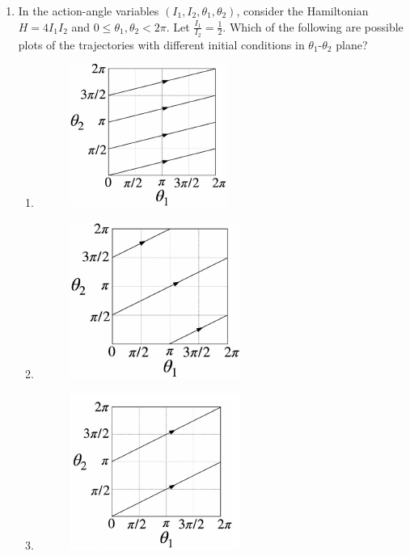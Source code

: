 \documentclass[journal,12pt,onecolumn]{IEEEtran}
\theoremstyle{remark}
\begin{document}
\begin{enumerate}
\item
In the action-angle variables $(I_1, I_2, \theta_1, \theta_2)$, consider the Hamiltonian $H = 4I_1 I_2$ and $0 \le \theta_1, \theta_2 < 2\pi$. Let $\frac{I_1}{I_2} = \frac{1}{2}$. Which of the following are possible plots of the trajectories with different initial conditions in $\theta_1$-$\theta_2$ plane?
\begin{enumerate}
    \item \begin{figure}[H] \caption*{} \label{fig:55a}\includegraphics{figs/55a.png}\end{figure}%
    \item \begin{figure}[H] \caption*{} \label{fig:55b}\includegraphics{figs/55b.png}\end{figure}%
    \item \begin{figure}[H] \caption*{} \label{fig:55c}\includegraphics{figs/55c.png}\end{figure}%

\end{enumerate}
\end{enumerate}
\end{document}
